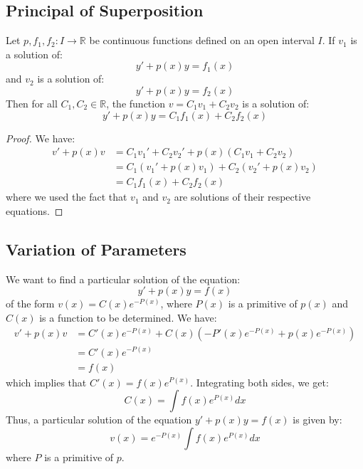 \subsection{Principal of Superposition}
\begin{theorem}
    Let $p,f_1, f_2: I \to \mathbb{R}$ be continuous functions defined on an open interval $I$. If $v_1$ is a solution of:
    \[
        y' + p(x)y = f_1(x)
    \]
    and $v_2$ is a solution of:
    \[
        y' + p(x)y = f_2(x)
    \]
    Then for all $C_1, C_2 \in \mathbb{R}$, the function $v = C_1 v_1 + C_2 v_2$ is a solution of:
    \[
        y' + p(x)y = C_1 f_1(x) + C_2 f_2(x)
    \]
\end{theorem}
\begin{proof}
    We have:
    \begin{align*}
        v' + p(x)v & = C_1 v_1' + C_2 v_2' + p(x)(C_1 v_1 + C_2 v_2) \\
        & = C_1 (v_1' + p(x) v_1) + C_2 (v_2' + p(x) v_2) \\
        & = C_1 f_1(x) + C_2 f_2(x)
    \end{align*}
    where we used the fact that $v_1$ and $v_2$ are solutions of their respective equations.
\end{proof}

\subsection{Variation of Parameters}
We want to find a particular solution of the equation:
\[
    y' + p(x) y = f(x)
\]
of the form $v(x) = C(x) e^{-P(x)}$, where $P(x)$ is a primitive of $p(x)$ and $C(x)$ is a function to be determined. We have:
\begin{align*}
    v' + p(x) v & = C'(x) e^{-P(x)} + C(x) \left(-P'(x) e^{-P(x)} + p(x) e^{-P(x)}\right) \\
    & = C'(x) e^{-P(x)} \\
    & = f(x)
\end{align*}
which implies that $C'(x) = f(x) e^{P(x)}$. Integrating both sides, we get:
\[
    C(x) = \int f(x) e^{P(x)} dx
\]Thus, a particular solution of the equation $y' + p(x) y = f(x)$ is given by:
\[
    v(x) = e^{-P(x)} \int f(x) e^{P(x)} dx
\]
where $P$ is a primitive of $p$.


